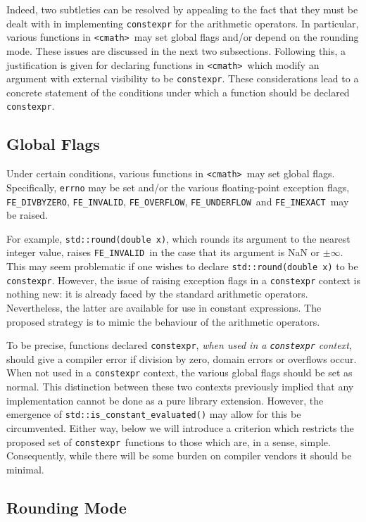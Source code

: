 \documentclass[prd,twocolumn,amsmath,amssymb,nofootinbib,eqsecnum]{revtex4-1}
\newcommand{\constexpr}{\code{constexpr}\xspace}
\newcommand{\code}[1]{{\tt #1}}
\newcommand{\header}[1]{{\tt <#1>}}
\newcommand{\cmath}{\header{cmath}}
\newcommand{\FEINVALID}{{\tt FE\_INVALID}}
\newcommand{\FEDIVBYZERO}{{\tt FE\_DIVBYZERO}}
\newcommand{\FEINEXACT}{{\tt FE\_INEXACT}}
\newcommand{\FEUNDERFLOW}{{\tt FE\_UNDERFLOW}}
\newcommand{\FEOVERFLOW}{{\tt FE\_OVERFLOW}}
\begin{document}
Indeed, two subtleties can be resolved by appealing to the fact that they must be dealt with in implementing \constexpr for the arithmetic operators. In particular, various functions in \cmath\ may set global flags and/or depend on the rounding mode. These issues are discussed in the next two subsections. Following this, a justification is given for declaring functions in \cmath\ which modify an argument with external visibility to be \constexpr. These considerations lead to a concrete statement of the conditions under which a function should be declared \constexpr.

\subsection{Global Flags}
\label{sec:global}

Under certain conditions, various functions in \cmath\ may set global flags.
Specifically, \code{errno} may be set and/or the various floating-point
exception flags, \FEDIVBYZERO, \FEINVALID, \FEOVERFLOW, \FEUNDERFLOW\ and
\FEINEXACT\ may be raised. 

For example, \code{std::round(double x)}, which rounds its argument to the nearest integer value, raises \FEINVALID\ in the case that its argument is NaN or $\pm \infty$. This may seem problematic if one wishes to declare \code{std::round(double x)} to be \constexpr. 
However, the issue of raising exception flags in a \constexpr context is nothing new: it is already faced by
the standard arithmetic operators. Nevertheless, the latter are available for use in constant
expressions. The proposed strategy is to mimic the behaviour of the arithmetic
operators.

To be precise, functions declared \constexpr, \emph{when used in a \constexpr
context}, should give a compiler error if division by zero, domain errors or
overflows occur. When not used in a \constexpr context, the various global
flags should be set as normal. This distinction between these two contexts previously 
implied that any implementation cannot be done as a pure library extension. However, the emergence of \code{std::is\_constant\_evaluated()} may allow for this be circumvented.
Either way, below
we will introduce a criterion which restricts the proposed set of \constexpr\ functions 
to those which are, in a sense, simple. Consequently, while there will be some burden 
on compiler vendors it should be minimal. 

\subsection{Rounding Mode}
\label{sec:rounding}
\end{document}
